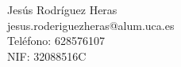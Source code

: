 Jesús Rodríguez Heras \\ %
jesus.roderiguezheras@alum.uca.es \\ %
Teléfono: 628576107 \\ %
NIF: 32088516C \\ %
